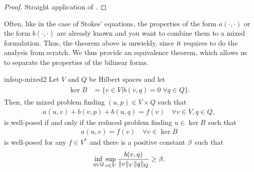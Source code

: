 \begin{proof}
  Straight application of .
\end{proof}

Often, like in the case of Stokes' equations, the properties of the
form $a(\cdot,\cdot)$ or the form $b(\cdot,\cdot)$ are already known
and you want to combine them to a mixed formulation. Thus, the theorem
above is unwieldy, since it requires to do the analysis from
scratch. We thus provide an equivalence theorem, which allows us to
separate the properties of the bilinear forms.

\begin{Theorem}{infsup-mixed2}
  Let $V$ and $Q$ be Hilbert spaces and let
  \begin{gather}
    \begin{split}
      \ker B &= \bigl\{v\in V \big| b(v,q) = 0 \;\forall q\in Q\bigr\}.
    \end{split}
  \end{gather}
  Then, the mixed problem finding $(u,p)\in V\times Q$ such that
  \begin{gather}
    a(u,v) + b(v,p) + b(u,q) = f(v) \quad\forall v\in V, q\in Q,
  \end{gather}
  is well-posed if and only if the reduced problem
  finding $u\in \ker B$ such that
    \begin{gather}
      a(u,v) = f(v) \quad\forall v\in \ker B
    \end{gather}
    is well-posed for any $f\in V^*$ and there is a positive constant
    $\beta$ such that
    \begin{gather}
      \inf_{q\in Q}\sup_{v\in V} \frac{b(v,q)}{\lVert v\rVert_V\lVert q\rVert_Q} \ge \beta.
    \end{gather}
\end{Theorem}

